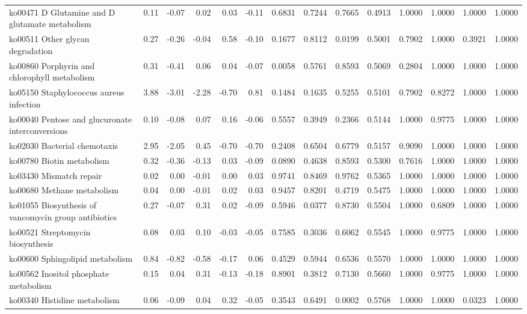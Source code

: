 {\begin{landscape}
\begin{longtable}{ | l | r | r | r | r | r | r  | r | r | r | r | r | r  | r  |}
			ko00471  D Glutamine and D glutamate metabolism & 0.11 & -0.07 & 0.02 & 0.03 & -0.11 & 0.6831 & 0.7244 & 0.7665 & 0.4913 & 1.0000 & 1.0000 & 1.0000 & 1.0000 \\ 
			ko00511  Other glycan degradation & 0.27 & -0.26 & -0.04 & 0.58 & -0.10 & 0.1677 & 0.8112 & 0.0199 & 0.5001 & 0.7902 & 1.0000 & 0.3921 & 1.0000 \\ 
			ko00860  Porphyrin and chlorophyll metabolism & 0.31 & -0.41 & 0.06 & 0.04 & -0.07 & 0.0058 & 0.5761 & 0.8593 & 0.5069 & 0.2804 & 1.0000 & 1.0000 & 1.0000 \\ 
			ko05150  Staphylococcus aureus infection & 3.88 & -3.01 & -2.28 & -0.70 & 0.81 & 0.1484 & 0.1635 & 0.5255 & 0.5101 & 0.7902 & 0.8272 & 1.0000 & 1.0000 \\ 
			ko00040  Pentose and glucuronate interconversions & 0.10 & -0.08 & 0.07 & 0.16 & -0.06 & 0.5557 & 0.3949 & 0.2366 & 0.5144 & 1.0000 & 0.9775 & 1.0000 & 1.0000 \\ 
			ko02030  Bacterial chemotaxis & 2.95 & -2.05 & 0.45 & -0.70 & -0.70 & 0.2408 & 0.6504 & 0.6779 & 0.5157 & 0.9090 & 1.0000 & 1.0000 & 1.0000 \\ 
			ko00780  Biotin metabolism & 0.32 & -0.36 & -0.13 & 0.03 & -0.09 & 0.0890 & 0.4638 & 0.8593 & 0.5300 & 0.7616 & 1.0000 & 1.0000 & 1.0000 \\ 
			ko03430  Mismatch repair & 0.02 & 0.00 & -0.01 & 0.00 & 0.03 & 0.9741 & 0.8469 & 0.9762 & 0.5365 & 1.0000 & 1.0000 & 1.0000 & 1.0000 \\ 
			ko00680  Methane metabolism & 0.04 & 0.00 & -0.01 & 0.02 & 0.03 & 0.9457 & 0.8201 & 0.4719 & 0.5475 & 1.0000 & 1.0000 & 1.0000 & 1.0000 \\ 
			ko01055  Biosynthesis of vancomycin group antibiotics & 0.27 & -0.07 & 0.31 & 0.02 & -0.09 & 0.5946 & 0.0377 & 0.8730 & 0.5504 & 1.0000 & 0.6809 & 1.0000 & 1.0000 \\ 
			ko00521  Streptomycin biosynthesis & 0.08 & 0.03 & 0.10 & -0.03 & -0.05 & 0.7585 & 0.3036 & 0.6062 & 0.5545 & 1.0000 & 0.9775 & 1.0000 & 1.0000 \\ 
			ko00600  Sphingolipid metabolism & 0.84 & -0.82 & -0.58 & -0.17 & 0.06 & 0.4529 & 0.5944 & 0.6536 & 0.5570 & 1.0000 & 1.0000 & 1.0000 & 1.0000 \\ 
			ko00562  Inositol phosphate metabolism & 0.15 & 0.04 & 0.31 & -0.13 & -0.18 & 0.8901 & 0.3812 & 0.7130 & 0.5660 & 1.0000 & 0.9775 & 1.0000 & 1.0000 \\ 
			ko00340  Histidine metabolism & 0.06 & -0.09 & 0.04 & 0.32 & -0.05 & 0.3543 & 0.6491 & 0.0002 & 0.5768 & 1.0000 & 1.0000 & 0.0323 & 1.0000 \\ 

\end{longtable}
\end{landscape}}
